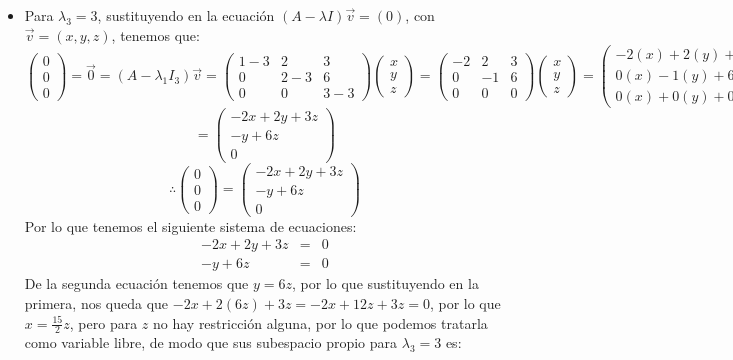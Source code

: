 \begin{itemize}
\begin{itemize}
\item Para $\lambda_3=3$, sustituyendo en la ecuaci\'on $(A-\lambda I)\vec{v}=(0)$, con $\vec{v}=(x,y,z)$, tenemos que:
    \[\begin{pmatrix}0\\
0\\0\end{pmatrix}=\vec{0}=(A-\lambda_1I_{3})\vec{v}=\begin{pmatrix}
    1-3 & 2 & 3\\
    0 & 2-3 & 6\\
    0 & 0 & 3-3\end{pmatrix}\begin{pmatrix}x\\
y\\z\end{pmatrix}=\begin{pmatrix}
    -2 & 2 & 3\\
    0 & -1 & 6\\
    0 & 0 & 0\end{pmatrix}\begin{pmatrix}x\\
y\\z\end{pmatrix}=\begin{pmatrix}-2(x)+2(y)+3(z)\\0(x)-1(y)+6(z)\\0(x)+0(y)+0(z)\end{pmatrix}\]\[=\begin{pmatrix}-2x+2y+3z\\-y+6z\\0\end{pmatrix}\]
\[\therefore \begin{pmatrix}0\\
0\\0\end{pmatrix}=\begin{pmatrix}-2x+2y+3z\\-y+6z\\0\end{pmatrix}\]
Por lo que tenemos el siguiente sistema de ecuaciones:
\begin{eqnarray*}
-2x+2y+3z&=&0\\-y+6z&=&0\end{eqnarray*}
De la segunda ecuaci\'on tenemos que $y=6z$, por lo que sustituyendo en la primera, nos queda que $-2x+2(6z)+3z=-2x+12z+3z=0$, por lo que $x=\frac{15}{2}z$, pero para $z$ no hay restricci\'on alguna, por lo que podemos tratarla como variable libre, de modo que sus subespacio propio para $\lambda_3=3$ es:

\end{itemize}
\end{itemize}
